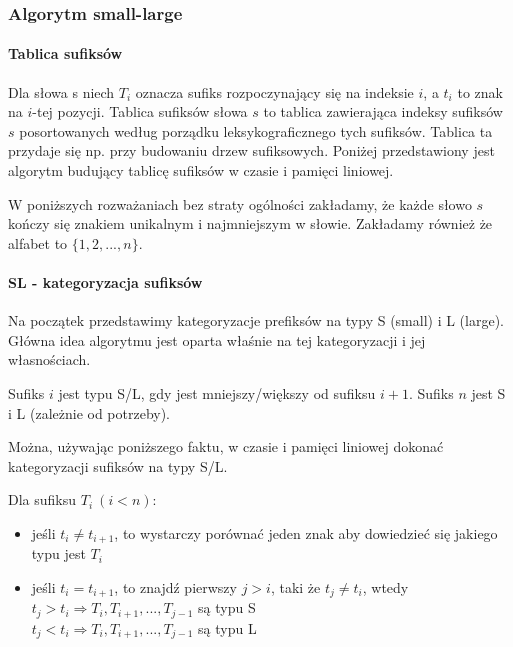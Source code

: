 \subsubsection{Algorytm small-large}


\paragraph{Tablica sufiksów}
Dla słowa s niech $T_i$ oznacza sufiks rozpoczynający się na indeksie $i$, a $t_i$ to znak na $i$-tej pozycji. Tablica sufiksów słowa $s$ to tablica zawierająca indeksy sufiksów $s$ posortowanych według porządku leksykograficznego tych sufiksów. Tablica ta przydaje się np. przy budowaniu drzew sufiksowych. Poniżej przedstawiony jest algorytm budujący tablicę sufiksów w czasie i pamięci liniowej.

W poniższych rozważaniach bez straty ogólności zakładamy, że każde słowo $s$ kończy się znakiem unikalnym i najmniejszym w słowie. Zakładamy również że alfabet to $\{1,2,...,n\}$.

\paragraph{SL - kategoryzacja sufiksów}

Na początek przedstawimy kategoryzacje prefiksów na typy S (small) i L (large). Główna idea algorytmu jest oparta właśnie na tej kategoryzacji i jej własnościach.

\begin{definition}{}{}
Sufiks $i$ jest typu S/L, gdy jest mniejszy/większy od sufiksu $i+1$. Sufiks $n$ jest S i L (zależnie od potrzeby).
\end{definition}

Można, używając poniższego faktu, w czasie i pamięci liniowej dokonać kategoryzacji sufiksów na typy S/L.

\begin{remark-thm}
Dla sufiksu $T_i \ (i<n)$:

\begin{itemize}
\item jeśli $t_i \neq t_{i+1}$, to wystarczy porównać jeden znak aby dowiedzieć się jakiego typu jest $T_i$
\item
jeśli $t_{i} = t_{i+1}$, to znajdź pierwszy $j > i$, taki że $t_j \neq t_i$, wtedy \\
$ t_j > t_i \Rightarrow T_i,T_{i+1},...,T_{j-1}$ są typu S \\
$ t_j < t_i \Rightarrow T_i,T_{i+1},...,T_{j-1}$ są typu L
\end{itemize}

\end{remark-thm}

